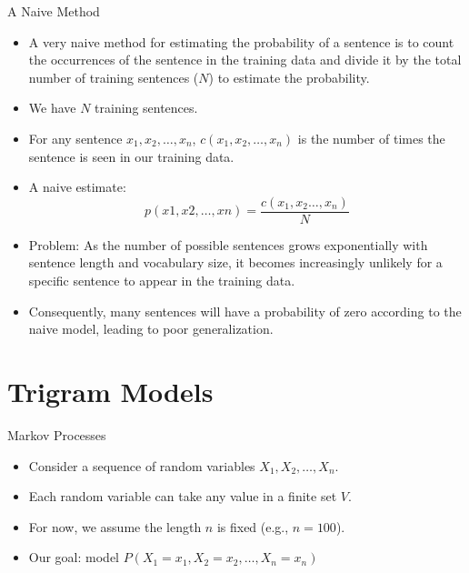 \documentclass[10pt]{beamer}
\begin{document}
\begin{frame}{A Naive Method}
\begin{scriptsize}
\begin{itemize}
\item A very naive method for estimating the probability of a sentence is to count the occurrences of the sentence in the training data and divide it by the total number of training sentences ($N$) to estimate the probability.
\item We have $N$ training sentences.
\item For any sentence $x_1, x_2, \ldots, x_n$, $c(x_1, x_2, \ldots, x_n)$ is the number of times the sentence is seen in our training data.
\item A naive estimate: \begin{displaymath}
                        p(x1,x2,…,xn)=\frac{c(x_1,x_2 \dots,x_n)}{N}
                        \end{displaymath}

                        
\item Problem: As the number of possible sentences grows exponentially with sentence length and vocabulary size, it becomes increasingly unlikely for a specific sentence to appear in the training data. 

\item Consequently, many sentences will have a probability of zero according to the naive model, leading to poor generalization.                      
\end{itemize}
\end{scriptsize}
\end{frame} 

\section{Trigram Models}

\begin{frame}{Markov Processes}
    \scriptsize
    \begin{itemize}
        \item Consider a sequence of random variables $X_1, X_2, \ldots, X_n$.
        \item Each random variable can take any value in a finite set $V$.
        \item For now, we assume the length $n$ is fixed (e.g., $n = 100$).
        \item Our goal: model $P(X_1 = x_1, X_2 = x_2, \ldots, X_n = x_n)$
    \end{itemize}
\end{frame}
\end{document}

